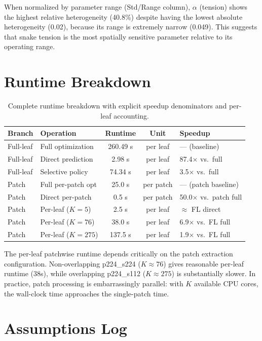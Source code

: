 \documentclass[11pt,a4paper]{article}
\begin{document}
When normalized by parameter range (Std/Range column), $\alpha$ (tension) shows the highest relative heterogeneity (40.8\%) despite having the lowest absolute heterogeneity (0.02), because its range is extremely narrow (0.049).
This suggests that snake tension is the most spatially sensitive parameter relative to its operating range.


\section{Runtime Breakdown}
\label{app:runtime}

\begin{table}[h]
\centering
\caption{Complete runtime breakdown with explicit speedup denominators and per-leaf accounting.}
\label{tab:runtime_full}
\begin{tabular}{llccl}
\toprule
Branch & Operation & Runtime & Unit & Speedup \\
\midrule
Full-leaf & Full optimization & 260.49 s & per leaf & --- (baseline) \\
Full-leaf & Direct prediction & 2.98 s & per leaf & 87.4$\times$ vs.\ full \\
Full-leaf & Selective policy & 74.34 s & per leaf & 3.5$\times$ vs.\ full \\
\midrule
Patch & Full per-patch opt & 25.0 s & per patch & --- (patch baseline) \\
Patch & Direct per-patch & 0.5 s & per patch & 50.0$\times$ vs.\ patch full \\
Patch & Per-leaf ($K{=}5$) & 2.5 s & per leaf & $\approx$ FL direct \\
Patch & Per-leaf ($K{=}76$) & 38.0 s & per leaf & 6.9$\times$ vs.\ FL full \\
Patch & Per-leaf ($K{=}275$) & 137.5 s & per leaf & 1.9$\times$ vs.\ FL full \\
\bottomrule
\end{tabular}
\end{table}

The per-leaf patchwise runtime depends critically on the patch extraction configuration.
Non-overlapping p224\_s224 ($K \approx 76$) gives reasonable per-leaf runtime (38s), while overlapping p224\_s112 ($K \approx 275$) is substantially slower.
In practice, patch processing is embarrassingly parallel: with $K$ available CPU cores, the wall-clock time approaches the single-patch time.


\section{Assumptions Log}
\label{app:assumptions}
\end{document}
